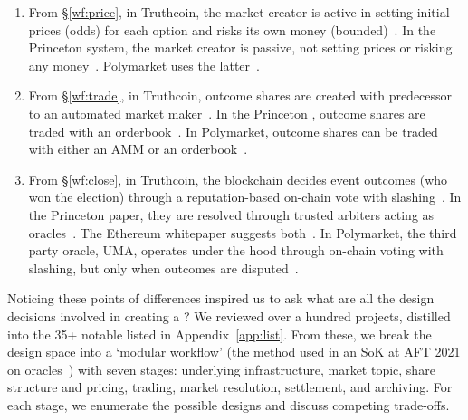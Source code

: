 \begin{enumerate}
\item From \S\ref{wf:price}, in Truthcoin, the market creator is active in setting initial prices (\ie odds) for each option and risks its own money (bounded)~\cite{Sz14}. In the Princeton system, the market creator is passive, not setting prices or risking any money~\cite{BCFKMN14}. Polymarket uses the latter~\cite{poly}. 

\item From \S\ref{wf:trade}, in Truthcoin, outcome shares are created with predecessor to an automated market maker~\cite{Sz14}. In the Princeton \depm, outcome shares are traded with an orderbook~\cite{BCFKMN14}. In Polymarket, outcome shares can be traded with either an AMM or an orderbook~\cite{poly}. 

\item From \S\ref{wf:close}, in Truthcoin, the blockchain decides event outcomes (\eg who won the election) through a reputation-based on-chain vote with slashing~\cite{Sz14}. In the Princeton paper, they are resolved through trusted arbiters acting as oracles~\cite{BCFKMN14}. The Ethereum whitepaper suggests both~\cite{But13}. In Polymarket, the third party oracle, UMA, operates under the hood through on-chain voting with slashing, but only when outcomes are disputed~\cite{poly,uma}.
\end{enumerate}

Noticing these points of differences inspired us to ask what are all the design decisions involved in creating a \depm?  We reviewed over a hundred projects, distilled into the 35+ notable \depms listed in Appendix~\ref{app:list}. From these, we break the \depm design space into a `modular workflow' (the method used in an SoK at AFT 2021 on oracles~\cite{ClEsGS21}) with seven stages: underlying infrastructure, market topic, share structure and pricing, trading, market resolution, settlement, and archiving. For each stage, we enumerate the possible designs and discuss competing trade-offs. 

